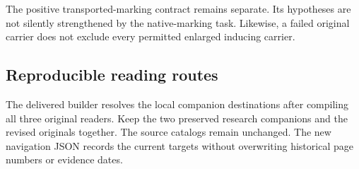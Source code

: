 The positive transported-marking contract remains separate. Its hypotheses are not silently strengthened by the native-marking task. Likewise, a failed original carrier does not exclude every permitted enlarged inducing carrier.

\subsection*{Reproducible reading routes}
The delivered builder resolves the local companion destinations after compiling all three original readers. Keep the two preserved research companions and the revised originals together. The source catalogs remain unchanged. The new navigation JSON records the current targets without overwriting historical page numbers or evidence dates.
